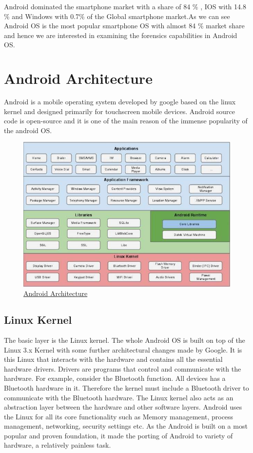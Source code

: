 Android dominated the smartphone market with a share of 84 \% , IOS with 14.8 \% and Windows with 0.7\% of the Global smartphone market.As we can see Android OS is the most popular smartphone OS with almost 84 \% market share and hence we  are interested in examining the forensics capabilities in Android OS. \\
\goodbreak
\section{Android Architecture}
Android is a mobile operating system developed by google based on the linux kernel and designed primarily for touchscreen mobile devices. Android source code is open-source and it is one of the main reason of the immense popularity of the android OS.\\
\begin{figure}[H]
   
    \includegraphics[height=0.5\textheight]{Figures/fig01/architecture}
    \caption{\href{https://www.tutorialspoint.com/android/}{Android Architecture} }
    
   
    
  \end{figure}


\subsection{Linux Kernel}
The basic layer is the Linux kernel. The whole Android OS is built on top of the Linux 3.x Kernel with some further architectural changes made by Google. It is this Linux that interacts with the hardware and contains all the essential hardware drivers. Drivers are programs that control and communicate with the hardware. For example, consider the Bluetooth function. All devices has a Bluetooth hardware in it. Therefore the kernel must include a Bluetooth driver to communicate with the Bluetooth hardware. The Linux kernel also acts as an abstraction layer between the hardware and other software layers. Android uses the Linux for all its core functionality such as Memory management, process management, networking, security settings etc. As the Android is built on a most popular and proven foundation, it made the porting of Android to variety of hardware, a relatively painless task.


